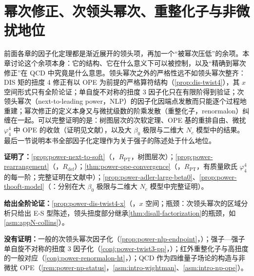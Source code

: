 \chapter{幂次修正、次领头幂次、重整化子与非微扰地位}\label{ch:power}

前面各章的因子化定理都是渐近展开的领头项，再加一个“被幂次压低”的余项。本章讨论这个余项本身：它的结构、它在什么意义下可以被控制，以及“精确到幂次修正”在 QCD 中究竟是什么意思。领头幂次之外的严格性远不如领头幂次整齐：DIS 矩的扭度 4 修正有以 OPE 为前提的严格算符结构（\cref{prop:dis-twist4}），其 $x$ 空间形式只有全阶论证；单自旋不对称的扭度 3 因子化只在有限阶得到验证；次领头幂次（next-to-leading power，NLP）的因子化因端点发散而只能逐个过程地重建；幂次修正的定义本身又与微扰级数的阶乘发散（重整化子，renormalon）纠缠在一起。可以完整证明的是：树图层次的次软定理、OPE 基的重排自由、微扰 $\varphi^4_4$ 中 OPE 的收敛（证明见文献），以及大 $\beta_0$ 极限与二维大 $N_c$ 模型中的结果。最后一节说明本书全部因子化定理作为关于强子的陈述处于什么地位。

\begin{tcolorbox}[enhanced,breakable,title=本章证明了什么／没有证明什么,fonttitle=\bfseries,
  colback=gray!3!white,colframe=gray!55!black,boxrule=0.6pt,arc=2pt,
  left=5pt,right=5pt,top=3pt,bottom=3pt,before skip=6pt,after skip=6pt]
\textbf{证明了：}\cref{prop:power-next-to-soft}（\tagR，$R_{\mathrm{PT}}$，树图层次）；\cref{prop:power-rearrangement}（\tagR，$R_{\mathrm{def}}$）；\cref{thm:power-ope-convergence}（\tagR，$R_{\mathrm{PT}}$，有质量欧氏 $\varphi^4_4$ 的每一阶；完整证明在文献中）；\cref{prop:power-adler-large-beta0}、\cref{prop:power-thooft-model}（\tagP：分别在大 $\beta_0$ 极限与二维大 $N_c$ 模型中完整证明）。\par
\textbf{给出全阶论证：}\cref{prop:power-dis-twist4-x}（\tagA，$x$ 空间；瓶颈：次领头幂次的区域分析只给出 E-S 型陈述，领头扭度部分继承\cref{thm:disall-factorization}的瓶颈，如 \cref{asm:appN-collins}）。\par
\textbf{没有证明：}一般的次领头幂次因子化（\cref{prop:power-nlp-endpoint}，\tagP）；强子—强子单自旋不对称的扭度 3 因子化（\cref{conj:power-twist3-pp}，\tagC）；红外重整化子与高扭度的一般对应（\cref{conj:power-renormalon-ht}，\tagC）；QCD 作为四维量子场论的构造与非微扰 OPE（\cref{rem:power-np-status}，\cref{asm:intro-wightman}、\cref{asm:intro-np-ope}）。
\end{tcolorbox}

